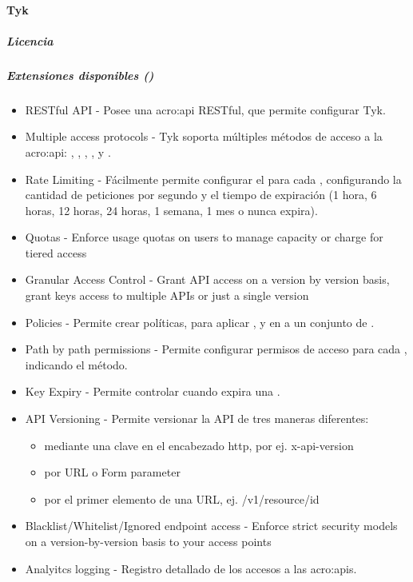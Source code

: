 \paragraph{Tyk}
\label{soa:tecnologias:tyk}

\subparagraph{Licencia}


\subparagraph{Extensiones disponibles ()}

\begin{itemize}
  \item RESTful API - Posee una \gls{acro:api} RESTful, que permite configurar Tyk.
  \item Multiple access protocols - Tyk soporta múltiples métodos de acceso a la \gls{acro:api}: , , , ,  y .
  \item Rate Limiting - Fácilmente permite configurar el  para cada , configurando la cantidad de peticiones por segundo y el tiempo de expiración (1 hora, 6 horas, 12 horas, 24 horas, 1 semana, 1 mes o nunca expira).
  \item Quotas - Enforce usage quotas on users to manage capacity or charge for tiered access
  \item Granular Access Control - Grant API access on a version by version basis, grant keys access to multiple APIs or just a single version
  \item Policies - Permite crear políticas, para aplicar ,  y  en a un conjunto de .
  \item Path by path permissions - Permite configurar permisos de acceso para cada , indicando el método.
  \item Key Expiry - Permite controlar cuando expira una .
  \item API Versioning - Permite versionar la API de tres maneras diferentes:
  \begin{itemize}
    \item mediante una clave en el encabezado http, por ej. x-api-version
    \item por URL o Form parameter
    \item por el primer elemento de una URL, ej. /v1/resource/id
  \end{itemize}
  \item Blacklist/Whitelist/Ignored endpoint access - Enforce strict security models on a version-by-version basis to your access points
  \item Analyitcs logging - Registro detallado de los accesos a las \glspl{acro:api}.

\end{itemize}
